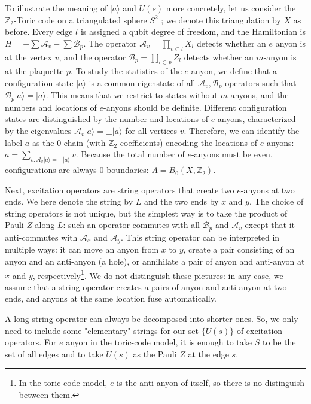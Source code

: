 \documentclass[reprint, amsmath, amssymb, showpacs, floatfix, longbibliography, aps, twocolumn, superscriptaddress, nofootinbib]{revtex4-2}
\newcommand{\ZZ}{{\mathbb Z}}
\theoremstyle{definition}
\begin{document}
To illustrate the meaning of $|a\rangle$ and $U(s)$ more concretely, let us consider the $\ZZ_2$-Toric code on a triangulated sphere $S^2$ \cite{Kitaev_2003}; we denote this triangulation by $X$ as before. Every edge $l$ is assigned a qubit degree of freedom, and the Hamiltonian is $H=-\sum \mathcal{A}_v-\sum \mathcal{B}_p$. The operator $\mathcal{A}_v=\prod_{v\subset l}X_l$ detects whether an $e$ anyon is at the vertex $v$, and the operator $\mathcal{B}_p=\prod _{l\subset p}Z_l$ detects whether an $m$-anyon is at the plaquette $p$. To study the statistics of the $e$ anyon, we define that a configuration state $|a\rangle$ is a common eigenstate of all $\mathcal{A}_v,\mathcal{B}_p$ operators such that $\mathcal{B}_p|a\rangle=|a\rangle$. This means that we restrict to states without $m$-anyons, and the numbers and locations of $e$-anyons should be definite. Different configuration states are distinguished by the number and locations of $e$-anyons, characterized by the eigenvalues $\mathcal{A}_v|a\rangle=\pm|a\rangle$ for all vertices $v$. Therefore, we can identify the label $a$ as the $0$-chain (with $\ZZ_2$ coefficients) encoding the locations of $e$-anyons: $a=\sum_{v:\mathcal{A}_v|a\rangle=-|a\rangle}v$. Because the total number of $e$-anyons must be even, configurations are always $0$-boundaries: $A=B_0(X,\ZZ_2)$.

Next, excitation operators are string operators that create two $e$-anyons at two ends. We here denote the string by $L$ and the two ends by $x$ and $y$. The choice of string operators is not unique, but the simplest way is to take the product of Pauli $Z$ along $L$: such an operator commutes with all $\mathcal{B}_p$ and $\mathcal{A}_v$ except that it anti-commutes with $\mathcal{A}_x$ and $\mathcal{A}_y$. This string operator can be interpreted in multiple ways: it can move an anyon from $x$ to $y$, create a pair consisting of an anyon and an anti-anyon (a hole), or annihilate a pair of anyon and anti-anyon at $x$ and $y$, respectively\footnote{In the toric-code model, $e$ is the anti-anyon of itself, so there is no distinguish between them.}. We do not distinguish these pictures: in any case, we assume that a string operator creates a pairs of anyon and anti-anyon at two ends, and anyons at the same location fuse automatically. 


A long string operator can always be decomposed into shorter ones. So, we only need to include some "elementary" strings for our set $\{U(s)\}$ of excitation operators. For $e$ anyon in the toric-code model, it is enough to take $S$ to be the set of all edges and to take $U(s)$ as the Pauli $Z$ at the edge $s$.
\end{document}
